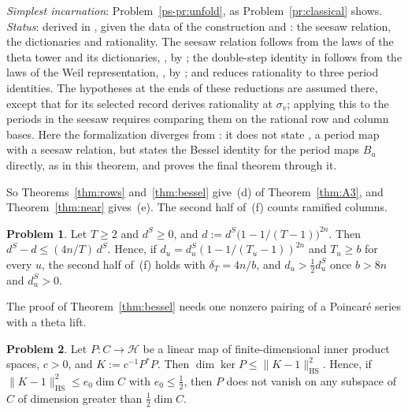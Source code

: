 \documentclass[reqno]{amsart}
\theoremstyle{definition}
\newtheorem{problem}{Problem}[section]
\theoremstyle{plain}
\newcommand{\Hc}{\mathcal{H}}
\newcommand{\HS}{\mathrm{HS}}
\newcommand{\dS}{d^{S}}
\begin{document}
\emph{Simplest incarnation}: Problem~\ref{ps-pr:unfold}, as Problem~\ref{pr:classical} shows.  \emph{Status}: derived in \cite[Thm.~14.15]{Adr}, given the data \cite[(P1)--(P5)]{Adr} of the construction and \cite[Hyps.~14.10--14.12]{Adr}: the seesaw relation, the dictionaries and rationality.  The seesaw relation \cite[Hyp.~14.10]{Adr} follows from the laws of the theta tower and its dictionaries, \cite[Hyps.~14.17 and~14.21]{Adr}, by \cite[Cor.~14.22, Rem.~14.23]{Adr}; the double-step identity in \cite[Hyp.~14.17]{Adr} follows from the laws of the Weil representation, \cite[Hyps.~14.27 and~14.28]{Adr}, by \cite[Thm.~14.29]{Adr}; and \cite[Lemma~14.24]{Adr} reduces rationality to three period identities.  The hypotheses at the ends of these reductions are assumed there, except that for its selected record \cite[\S14.2.4, (14.15)]{Adr} derives rationality at \(\sigma_v\); applying this to the periods in the seesaw requires comparing them on the rational row and column bases.  Here the formalization diverges from \cite{Adr}: it does not state \cite[Hyp.~14.10]{Adr}, a period map with a seesaw relation, but states the Bessel identity for the period maps \(B_u\) directly, as in this theorem, and proves the final theorem through it.

So Theorems~\ref{thm:rows} and~\ref{thm:bessel} give~(d) of Theorem~\ref{thm:A3}, and Theorem~\ref{thm:near} gives~(e).  The second half of~(f) counts ramified columns.

\begin{problem}\label{pr:ramified}
Let \(T \ge 2\) and \(\dS \ge 0\), and \(d := \dS\bigl(1 - 1/(T - 1)\bigr)^{2n}\).  Then \(\dS - d \le (4n/T)\,\dS\).  Hence, if \(d_u = \dS_u(1 - 1/(T_u - 1))^{2n}\) and \(T_u \ge b\) for every \(u\), the second half of~(f) holds with \(\delta_T = 4n/b\), and \(d_u > \frac12\dS_u\) once \(b > 8n\) and \(\dS_u > 0\).
\end{problem}

The proof of Theorem~\ref{thm:bessel} needs one nonzero pairing of a Poincar\'e series with a theta lift.

\begin{problem}\label{pr:kernel}
Let \(P \colon C \to \Hc\) be a linear map of finite-dimensional inner product spaces, \(c > 0\), and \(K := c^{-1}P^*P\).  Then \(\dim\ker P \le \lVert K - 1\rVert_\HS^2\).  Hence, if \(\lVert K - 1\rVert_\HS^2 \le e_0\dim C\) with \(e_0 \le \frac12\), then \(P\) does not vanish on any subspace of \(C\) of dimension greater than \(\frac12\dim C\).
\end{problem}
\end{document}
